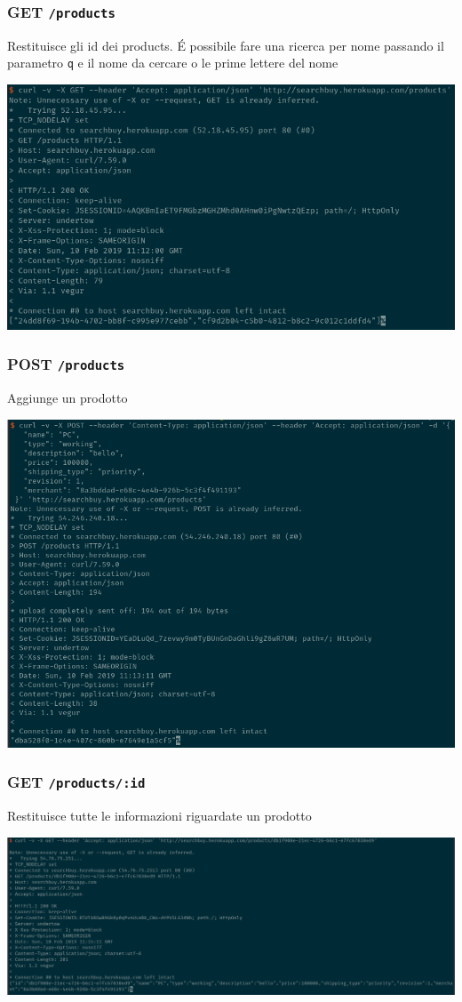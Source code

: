 \documentclass[11pt]{article}
\begin{document}
\subsubsection{GET \texttt{/products}}
\label{sec:org6ec5006}
Restituisce gli id dei products.  
É possibile fare una ricerca per nome passando il parametro \texttt{q} e il nome da cercare o le prime lettere del nome
\begin{center}
\includegraphics[width=.9\linewidth]{img/products-screen/get-products.png}
\end{center}
\subsubsection{POST \texttt{/products}}
\label{sec:orga95856c}
Aggiunge un prodotto
\begin{center}
\includegraphics[width=.9\linewidth]{img/products-screen/post-products.png}
\end{center}
\subsubsection{GET \texttt{/products/:id}}
\label{sec:org521fd37}
Restituisce tutte le informazioni riguardate un prodotto
\begin{center}
\includegraphics[width=.9\linewidth]{img/products-screen/get-product.png}
\end{center}
\end{document}
